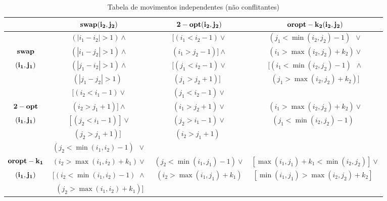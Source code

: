 \begin{table}[htpb]
    \small
    \centering
    \begin{tabular}{c|c|c|c}
                          & $\mathbf{swap(i_2,j_2)}$             & $\mathbf{2-opt(i_2,j_2)}$    & $\mathbf{oropt-k_2(i_2,j_2)}$ \\
        \hline
                          & $(|i_1-i_2| > 1) \land$         & $[(i_1 < i_2-1) \lor$     & $(j_1 < \min(i_2,j_2)-1)\,\,\, \lor  $ \\
		$\mathbf{swap}$        & $(|i_1-j_2| > 1) \land$  		& $ (i_1 > j_2-1)] \land$   & $(i_1 > \max(i_2,j_2)+k_2) \lor  $ \\
		$\mathbf{(i_1,j_1)}$   & $(|j_1-i_2| > 1) \land$  		& $[(j_1 < i_2-1) \lor$     & $[(i_1 < \min(i_2,j_2)-1)\,\,\, \land $ \\
			              & $(|j_1-j_2| > 1) \,\,\,$ 		& $ (j_1 > j_2+1)]\,\,\,\,$ & $\,\,\,(j_1 > \max(i_2,j_2)+k_2)] \,\,\,$ \\
        \hline 
                          & $[(i_2 < i_1-1) \lor$    		& $(j_1 < i_2 - 1) \lor$   & \\
		$\mathbf{2-opt}$	  & $ (i_2 > j_1+1)] \land$  		& $(i_1 > j_2 + 1) \lor$   & $(i_1 > \max(i_2,j_2)+k_2) \lor$   \\
		$\mathbf{(i_1,j_1)}$	  & $[(j_2 < i_1-1)] \lor$   		& $(j_2 > i_1 - 1) \lor$   & $(j_1 < \min(i_2,j_2)-1) \,\,\,\,$ \\
			              & $ (j_2 > j_1+1)]\,\,\,$  		& $(i_2 > j_1 + 1)\,\,\,$  & \\
        \hline
                          & $(j_2  < \min(i_1,i_2)-1)\,\,\, \lor$	    &   				                & \\
		$\mathbf{oropt-k_1}$ & $(i_2  > \max(i_1,i_2)+k_1) \lor$           & $(j_2 < \min(i_1,j_1)-1) \lor$ & $[\max(i_1,j_1)+k_1 < \min(i_2,j_2)] \lor$ \\
		$\mathbf{(i_1,j_1)}$	  & $[(i_2 < \min(i_1,i_2)-1)\,\,\land$   	    & $(i_2 > \max(i_1,j_1)+k_1)$  & $[\min(i_1,j_1) > \max(i_2,j_2)+k_2]\,\,\,\,$\\
			              & $\,\,\,\,(j_2  > \max(i_1,i_2)+k_1)]\,\,\,$ &    	                            &  \\
    \end{tabular}
    \caption{Tabela de movimentos independentes (não conflitantes)}
    \label{tab_confict}
\end{table}

